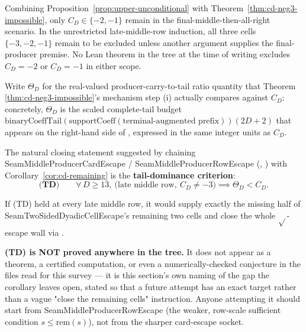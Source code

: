 \begin{cor}
\label{cor:cd-remaining}
Combining Proposition~\ref{prop:upper-unconditional} with Theorem~\ref{thm:cd-neg3-impossible},
only $C_D\in\{-2,-1\}$ remain in the final-middle-then-all-right scenario. In the unrestricted
late-middle-row induction, all three cells $\{-3,-2,-1\}$ remain to be excluded unless another
argument supplies the final-producer premise. No Lean theorem in the tree at the time of writing
excludes $C_D=-2$ or $C_D=-1$ in either scope.
\ 
\end{cor}

\begin{rem}
\label{rem:tail-dominance-open}
Write $\Theta_D$ for the real-valued producer-carry-to-tail ratio quantity that Theorem
\ref{thm:cd-neg3-impossible}'s mechanism step (i) actually compares against $C_D$: concretely,
$\Theta_D$ is the scaled complete-tail budget
$\mathrm{binaryCoeffTail}(\mathrm{supportCoeff}(\text{terminal-augmented prefix}))(2D+2)$ that
appears on the right-hand side of
,
expressed in the same integer units as $C_D$.

\par\medskip

The natural closing statement suggested by chaining
\textsf{SeamMiddleProducerCardEscape} / \textsf{SeamMiddleProducerRowEscape}
(,
) with
Corollary~\ref{cor:cd-remaining} is the \textbf{tail-dominance criterion}:
\[
  \textbf{(TD)}\qquad \forall\, D\ge 13,\ \big(\text{late middle row},\ C_D\ne -3\big) \implies
  \Theta_D < C_D.
\]

\par\medskip

If (TD) held at every late middle row, it would supply exactly the missing half of
\textsf{SeamTwoSidedDyadicCellEscape}'s remaining two cells and close the whole
$\sqrt{}$-escape wall via
.

\par\medskip

\textbf{(TD) is NOT proved anywhere in the tree.} It does not appear as a theorem, a certified
computation, or even a numerically-checked conjecture in the files read for this survey — it is
this section's own naming of the gap the corollary leaves open, stated so that a future attempt has
an exact target rather than a vague "close the remaining cells" instruction. Anyone attempting it
should start from \textsf{SeamMiddleProducerRowEscape} (the weaker, row-scale sufficient condition
$s\le\mathrm{rem}(s)$), not from the sharper card-escape socket.
\end{rem}

